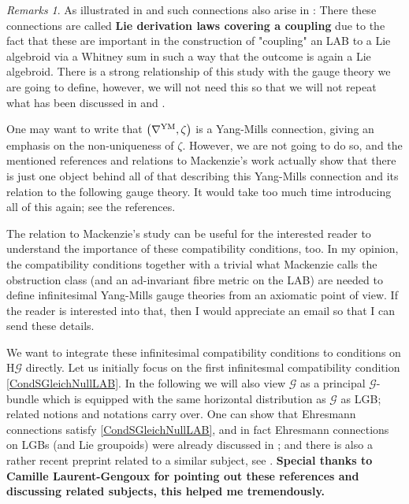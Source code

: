 \documentclass[a4paper,oneside,11pt,bibliography=totoc]{scrartcl}
\theoremstyle{plain}
\theoremstyle{remark}
\newtheorem{remark}[theorem]{Remarks}
\theoremstyle{definition}
\begin{document}
\begin{remark}\label{MackenziesStuffRelation}
\leavevmode\newline
As illustrated in \cite[\S 5.1]{MyThesis} and \cite{My1stpaper} such connections also arise in \cite[\S 7.2, page 271ff.]{mackenzieGeneralTheory}: There these connections are called \textbf{Lie derivation laws covering a coupling} due to the fact that these are important in the construction of "coupling" an LAB to a Lie algebroid via a Whitney sum in such a way that the outcome is again a Lie algebroid. There is a strong relationship of this study with the gauge theory we are going to define, however, we will not need this so that we will not repeat what has been discussed in \cite[\S 5.1]{MyThesis} and \cite{My1stpaper}. 

One may want to write that $\mleft( \nabla^{\mathrm{YM}}, \zeta \mright)$ is a Yang-Mills connection, giving an emphasis on the non-uniqueness of $\zeta$. However, we are not going to do so, and the mentioned references and relations to Mackenzie's work actually show that there is just one object behind all of that describing this Yang-Mills connection and its relation to the following gauge theory. It would take too much time introducing all of this again; see the references.

The relation to Mackenzie's study can be useful for the interested reader to understand the importance of these compatibility conditions, too. In my opinion, the compatibility conditions together with a trivial what Mackenzie calls the obstruction class (and an ad-invariant fibre metric on the LAB) are needed to define infinitesimal Yang-Mills gauge theories from an axiomatic point of view. If the reader is interested into that, then I would appreciate an email so that I can send these details.
\end{remark}

We want to integrate these infinitesimal compatibility conditions to conditions on $\mathrm{H}\mathcal{G}$ directly.
Let us initially focus on the first infinitesmal compatibility condition \eqref{CondSGleichNullLAB}. In the following we will also view $\mathcal{G}$ as a principal $\mathcal{G}$-bundle which is equipped with the same horizontal distribution as $\mathcal{G}$ as LGB; related notions and notations carry over. One can show that Ehresmann connections satisfy \eqref{CondSGleichNullLAB}, and in fact Ehresmann connections on LGBs (and Lie groupoids) were already discussed in \cite{LAURENTGENGOUXStienonXuMultiplicativeForms}; and there is also a rather recent preprint related to a similar subject, see \cite{FernandesMarcutMultiplicativeForms}. \textbf{Special thanks to Camille Laurent-Gengoux for pointing out these references and discussing related subjects, this helped me tremendously.}
\end{document}
